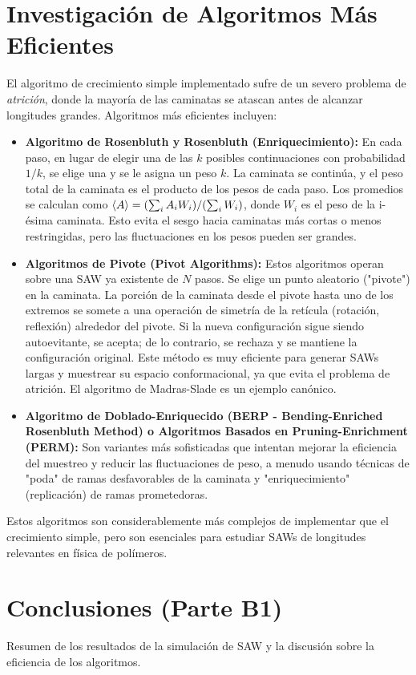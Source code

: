\documentclass[11pt,a4paper]{article}
\begin{document}
\section{Investigación de Algoritmos Más Eficientes}
El algoritmo de crecimiento simple implementado sufre de un severo problema de \textit{atrición}, donde la mayoría de las caminatas se atascan antes de alcanzar longitudes grandes. Algoritmos más eficientes incluyen:
\begin{itemize}
    \item \textbf{Algoritmo de Rosenbluth y Rosenbluth (Enriquecimiento):}
    En cada paso, en lugar de elegir una de las $k$ posibles continuaciones con probabilidad $1/k$, se elige una y se le asigna un peso $k$. La caminata se continúa, y el peso total de la caminata es el producto de los pesos de cada paso. Los promedios se calculan como $\expval{A} = (\sum_i A_i W_i) / (\sum_i W_i)$, donde $W_i$ es el peso de la i-ésima caminata. Esto evita el sesgo hacia caminatas más cortas o menos restringidas, pero las fluctuaciones en los pesos pueden ser grandes.
    \item \textbf{Algoritmos de Pivote (Pivot Algorithms):}
    Estos algoritmos operan sobre una SAW ya existente de $N$ pasos. Se elige un punto aleatorio ("pivote") en la caminata. La porción de la caminata desde el pivote hasta uno de los extremos se somete a una operación de simetría de la retícula (rotación, reflexión) alrededor del pivote. Si la nueva configuración sigue siendo autoevitante, se acepta; de lo contrario, se rechaza y se mantiene la configuración original. Este método es muy eficiente para generar SAWs largas y muestrear su espacio conformacional, ya que evita el problema de atrición. El algoritmo de Madras-Slade es un ejemplo canónico.
    \item \textbf{Algoritmo de Doblado-Enriquecido (BERP - Bending-Enriched Rosenbluth Method) o Algoritmos Basados en Pruning-Enrichment (PERM):}
    Son variantes más sofisticadas que intentan mejorar la eficiencia del muestreo y reducir las fluctuaciones de peso, a menudo usando técnicas de "poda" de ramas desfavorables de la caminata y "enriquecimiento" (replicación) de ramas prometedoras.
\end{itemize}
Estos algoritmos son considerablemente más complejos de implementar que el crecimiento simple, pero son esenciales para estudiar SAWs de longitudes relevantes en física de polímeros.

\section{Conclusiones (Parte B1)}
Resumen de los resultados de la simulación de SAW y la discusión sobre la eficiencia de los algoritmos.
\end{document}
